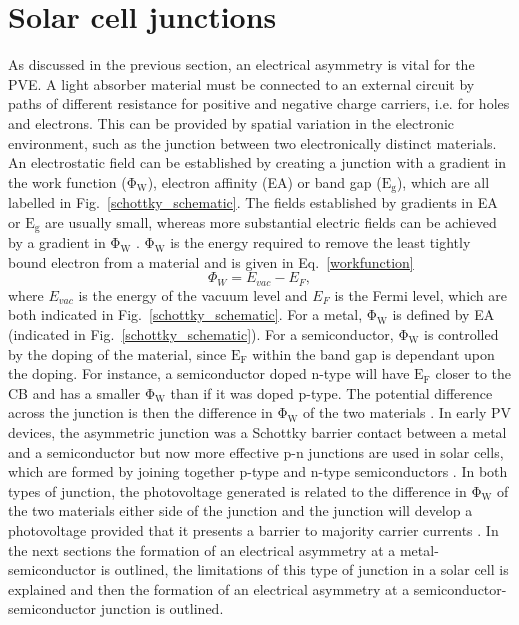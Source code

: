 \documentclass[11pt, twoside]{report}
\begin{document}
\section{Solar cell junctions}\label{junctions}
As discussed in the previous section, an electrical asymmetry is vital for the PVE. A light absorber material must be connected to an external circuit by paths of different resistance for positive and negative charge carriers, i.e. for holes and electrons. This can be provided by spatial variation in the electronic environment, such as the junction between two electronically distinct materials.
An electrostatic field can be established by creating a junction with a gradient in the work function ($\mathrm{\Phi_W}$), electron affinity (EA) or band gap ($\mathrm{E_g}$), which are all labelled in Fig.~\ref{schottky_schematic}. The fields established by gradients in EA or $\mathrm{E_g}$ are usually small, whereas more substantial electric fields can be achieved by a gradient in $\mathrm{\Phi_W}$ \cite{Nelson5}.
$\mathrm{\Phi_W}$ is the energy required to remove the least tightly bound electron from a material and is given in Eq.~\ref{workfunction}
\begin{equation}\label{workfunction}
\Phi_W = E_{vac} - E_F,
\end{equation}
where $E_{vac}$ is the energy of the vacuum level and $E_F$ is the Fermi level, which are both indicated in Fig.~\ref{schottky_schematic}. 
For a metal, $\mathrm{\Phi_W}$ is defined by EA (indicated in Fig.~\ref{schottky_schematic}). For a semiconductor, $\mathrm{\Phi_W}$ is controlled by the doping of the material, since $\mathrm{E_F}$ within the band gap is dependant upon the doping. For instance, a semiconductor doped n-type will have $\mathrm{E_F}$ closer to the CB and has a smaller $\mathrm{\Phi_W}$ than if it was doped p-type. The potential difference across the junction is then the difference in $\mathrm{\Phi_W}$ of the two materials \cite{Nelson5}.
In early PV devices, the asymmetric junction was a Schottky barrier contact between a metal and a semiconductor but now more effective p-n junctions are used in solar cells, which are formed by joining together p-type and n-type semiconductors \cite{Nelson1}.
In both types of junction, the photovoltage generated is related to the difference in $\mathrm{\Phi_W}$ of the two materials either side of the junction and the junction will develop a photovoltage provided that it presents a barrier to majority carrier currents \cite{Nelson5}. In the next sections the formation of an electrical asymmetry at a metal-semiconductor is outlined, the limitations of this type of junction in a solar cell is explained and then the formation of an electrical asymmetry at a semiconductor-semiconductor junction is outlined.
\end{document}
